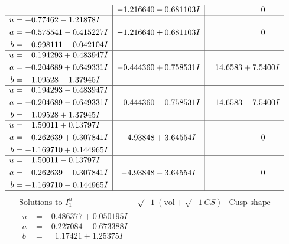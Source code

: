 \documentclass[1p]{elsarticle_modified}
\theoremstyle{definition}
\newcommand{\I}{\sqrt{-1}}
\begin{document}
$$\begin{array}{c|c|c}
 & -1.216640 - 0.681103 I & \phantom{-0.000000 } 0 \\ \hline\begin{aligned}
u &= -0.77462 - 1.21878 I \\
a &= -0.575541 - 0.415227 I \\
b &= \phantom{-}0.998111 - 0.042104 I\end{aligned}
 & -1.216640 + 0.681103 I & \phantom{-0.000000 } 0 \\ \hline\begin{aligned}
u &= \phantom{-}0.194293 + 0.483947 I \\
a &= -0.204689 + 0.649331 I \\
b &= \phantom{-}1.09528 - 1.37945 I\end{aligned}
 & -0.444360 + 0.758531 I & \phantom{-}14.6583 + 7.5400 I \\ \hline\begin{aligned}
u &= \phantom{-}0.194293 - 0.483947 I \\
a &= -0.204689 - 0.649331 I \\
b &= \phantom{-}1.09528 + 1.37945 I\end{aligned}
 & -0.444360 - 0.758531 I & \phantom{-}14.6583 - 7.5400 I \\ \hline\begin{aligned}
u &= \phantom{-}1.50011 + 0.13797 I \\
a &= -0.262639 + 0.307841 I \\
b &= -1.169710 + 0.144965 I\end{aligned}
 & -4.93848 + 3.64554 I & \phantom{-0.000000 } 0 \\ \hline\begin{aligned}
u &= \phantom{-}1.50011 - 0.13797 I \\
a &= -0.262639 - 0.307841 I \\
b &= -1.169710 - 0.144965 I\end{aligned}
 & -4.93848 - 3.64554 I & \phantom{-0.000000 } 0\\
 \hline 
 \end{array}$$\newpage$$\begin{array}{c|c|c}  
\text{Solutions to }I^u_{1}& \I (\text{vol} + \sqrt{-1}CS) & \text{Cusp shape}\\
 \hline 
\begin{aligned}
u &= -0.486377 + 0.050195 I \\
a &= -0.227084 - 0.673388 I \\
b &= \phantom{-}1.17421 + 1.25375 I\end{aligned}

\end{array}$$
\end{document}
